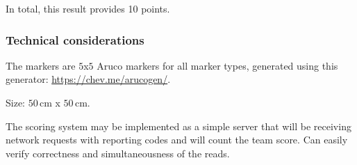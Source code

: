 In total, this result provides 10 points.

\subsubsection{Technical considerations}
The markers are $5$x$5$ Aruco markers for all marker types, generated using this generator: \url{https://chev.me/arucogen/}.


Size: $50$\,cm x $50$\,cm. 




The scoring system may be implemented as a simple server that will be receiving network requests with reporting codes and will count the team score. Can easily verify correctness and simultaneousness of the reads.
